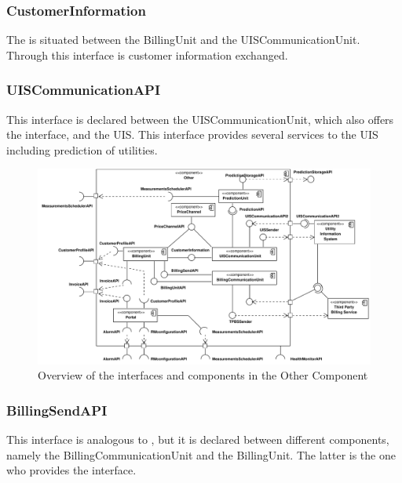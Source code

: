 \subsubsection{CustomerInformation}

\npar The  is situated between the BillingUnit
and the UISCommunicationUnit. Through this interface is customer information
exchanged.

\subsubsection{UISCommunicationAPI}

\npar This interface is declared between the UISCommunicationUnit, which
also offers the interface, and the UIS. This interface provides several services
to the UIS including prediction of utilities.

\begin{figure}[H]
	\begin{centering}
		\includegraphics[width=1.4\textwidth,angle=90]{figs/add-it10-interfaces.pdf}
		\caption{Overview of the interfaces and components in the Other Component}
		\label{fig:it10/interfaces}
	\end{centering}
\end{figure}

\subsubsection{BillingSendAPI}

\npar This interface is analogous to , but it
is declared between different components, namely the BillingCommunicationUnit
and the BillingUnit. The latter is the one who provides the interface.


